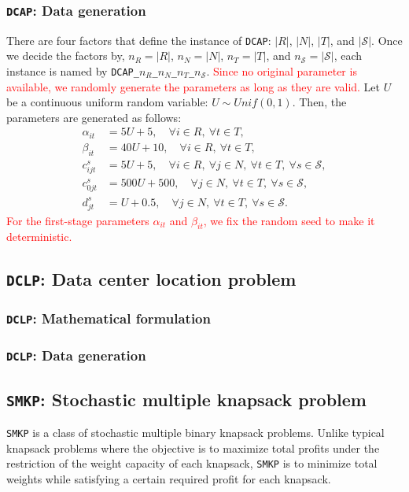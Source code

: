 \subsubsection{\texttt{DCAP}: Data generation}
There are four factors that define the instance of \texttt{DCAP}: $|R|$, $|N|$, $|T|$, and $|\mathcal{S}|$. Once we decide the factors by, $n_R=|R|$, $n_N=|N|$, $n_T=|T|$, and $n_\mathcal{S}=|\mathcal{S}|$, each instance is named by \texttt{DCAP\_$n_R$\_$n_N$\_$n_T$\_$n_\mathcal{S}$}. \textcolor{red}{Since no original parameter is available, we randomly generate the parameters as long as they are valid.} Let $U$ be a continuous uniform random variable: $U\sim Unif(0,1)$. Then, the parameters are generated as follows:
\begin{align*}
	\alpha_{it}&=5U+5,\quad\forall i\in R,\ \forall t\in T, \\
	\beta_{it} &=40U+10,\quad\forall i\in R,\ \forall t\in T, \\
	c_{ijt}^s  &=5U+5,\quad\forall i\in R,\ \forall j\in N,\ \forall t\in T,\ \forall s\in\mathcal{S}, \\
	c_{0jt}^s  &=500U+500,\quad\forall j\in N,\ \forall t\in T,\ \forall s\in\mathcal{S}, \\
	d_{jt}^s   &=U+0.5,\quad\forall j\in N,\ \forall t\in T,\ \forall s\in\mathcal{S}.
\end{align*}
\textcolor{red}{For the first-stage parameters $\alpha_{it}$ and $\beta_{it}$, we fix the random seed to make it deterministic.}

\subsection{\texttt{DCLP}: Data center location problem}

\subsubsection{\texttt{DCLP}: Mathematical formulation}

\subsubsection{\texttt{DCLP}: Data generation}


\subsection{\texttt{SMKP}: Stochastic multiple knapsack problem}
\texttt{SMKP} is a class of stochastic multiple binary knapsack problems. Unlike typical knapsack problems where the objective is to maximize total profits under the restriction of the weight capacity of each knapsack, \texttt{SMKP} is to minimize total weights while satisfying a certain required profit for each knapsack. 

